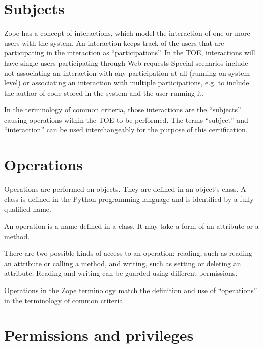 \documentclass[12pt,english]{scrbook}
\begin{document}
\section{Subjects}

Zope has a concept of interactions, which model the interaction of one or more
users with the system.  An interaction keeps track of the users that are
participating in the interaction as ``participations''.  In the TOE,
interactions will have single users participating through Web requests
Special scenarios include not associating an
interaction with any participation at all (running on system level) or
associating an interaction with multiple participations, e.g. to include the
author of code stored in the system and the user running it.

In the terminology of common criteria, those interactions are the ``subjects''
causing operations within the TOE to be performed. The terms ``subject'' and
``interaction'' can be used interchangeably for the purpose of this
certification.


\section{Operations}

Operations are performed on objects. They are defined in an object's class. A
class is defined in the Python programming language and is identified by a
fully qualified name.


An operation is a name defined in a class. It may take a form of an attribute
or a method.

There are two possible kinds of access to an operation: reading, such as reading
an attribute or calling a method, and writing, such as setting or deleting an
attribute. Reading and writing can be guarded using different permissions.

Operations in the Zope terminology match the definition and use of
``operations'' in the terminology of common criteria.


\section{Permissions and privileges}
\end{document}
